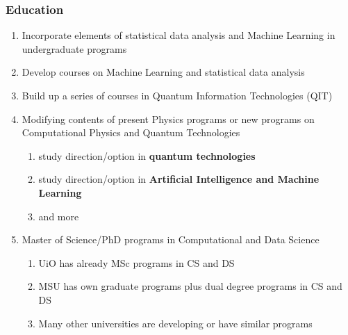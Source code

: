 \documentclass{beamer}
\begin{document}
\begin{frame}
\frametitle{Education}

\begin{enumerate}
\item Incorporate elements of statistical data analysis and Machine Learning in undergraduate programs

\item Develop courses on Machine Learning and statistical data analysis

\item Build up a series of courses in Quantum Information Technologies (QIT)

\item Modifying contents of present Physics programs or new programs on  Computational Physics and Quantum Technologies
\begin{enumerate}

 \item study direction/option in \textbf{quantum technologies}

 \item study direction/option in \textbf{Artificial Intelligence and Machine Learning}

 \item and more

\end{enumerate}

\noindent
\item Master of Science/PhD programs in Computational and Data Science
\begin{enumerate}

 \item UiO has already MSc programs in CS and DS

 \item MSU has own graduate programs plus dual degree programs in CS and DS

 \item Many other universities are developing or have similar programs
\end{enumerate}

\noindent
\end{enumerate}

\noindent
\end{frame}
\end{document}
